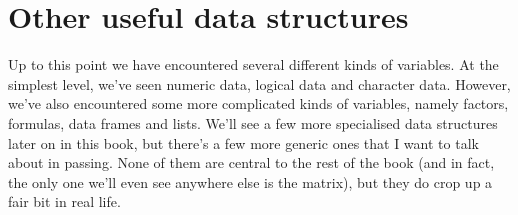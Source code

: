 \section{Other useful data structures~\label{sec:datastructures}}

Up to this point we have encountered several different kinds of variables. At the simplest level, we've seen numeric data, logical data and character data. However, we've also encountered some more complicated kinds of variables, namely factors, formulas, data frames and lists. We'll see a few more specialised data structures later on in this book, but there's a few more generic ones that I want to talk about in passing. None of them are central to the rest of the book (and in fact, the only one we'll even see anywhere else is the matrix), but they do crop up a fair bit in real life. 




